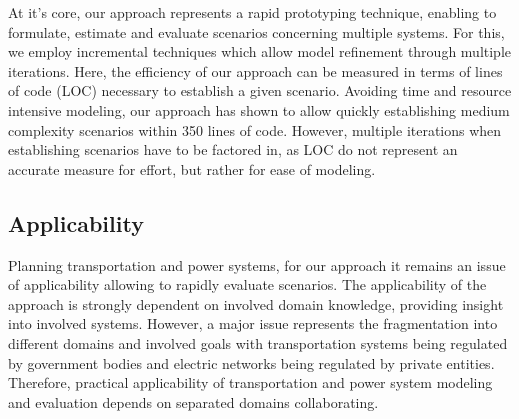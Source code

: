 
At it's core, our approach represents a rapid prototyping technique, enabling to formulate, estimate and evaluate scenarios concerning multiple systems. For this, we employ incremental techniques which allow model refinement through multiple iterations. Here, the efficiency of our approach can be measured in terms of lines of code (LOC) necessary to establish a given scenario. Avoiding time and resource intensive modeling, our approach has shown to allow quickly establishing medium complexity scenarios within 350 lines of code. However, multiple iterations when establishing scenarios have to be factored in, as LOC do not represent an accurate measure for effort, but rather for ease of modeling. 


\subsection{Applicability}


Planning transportation and power systems, for our approach it remains an issue of applicability allowing to rapidly evaluate scenarios. The applicability of the approach is strongly dependent on involved domain knowledge, providing insight into involved systems. However, a major issue represents the fragmentation into different domains and involved goals with transportation systems being regulated by government bodies and electric networks being regulated by private entities. Therefore, practical applicability of transportation and power system modeling and evaluation depends on separated domains collaborating. 

